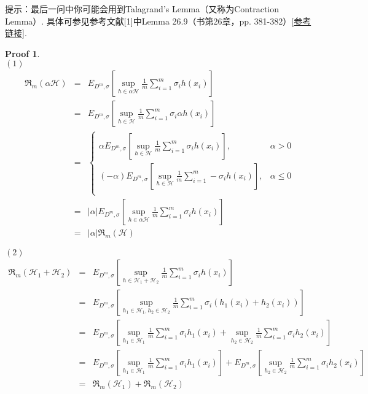 \documentclass[a4paper,UTF8]{article}
\numberwithin{equation}{section}
\newtheorem*{myProof}{Proof}
\begin{document}
\noindent 提示：最后一问中你可能会用到Talagrand's Lemma（又称为Contraction Lemma）. 具体可参见参考文献[1]中Lemma 26.9（书第26章，pp. 381-382）[\href{http://www.cs.huji.ac.il/~shais/UnderstandingMachineLearning/copy.html}{参考链接}].
\begin{myProof}~\\

$(1)$
\begin{eqnarray*}
\mathfrak{R}_m(\alpha \mathcal{H}) &=& E_{D^m, \sigma}[\sup_{h \in \alpha \mathcal{H}} \frac{1}{m} \sum_{i=1}^m \sigma_i h(x_i)] \\
&=& E_{D^m, \sigma}[\sup_{h \in \mathcal{H}} \frac{1}{m} \sum_{i=1}^m \sigma_i \alpha h(x_i)] \\
&=& \left\{
\begin{array}{lr}
	\alpha E_{D^m, \sigma}[\sup_{h \in \mathcal{H}} \frac{1}{m} \sum_{i=1}^m \sigma_i h(x_i)], &\alpha > 0 \\
	(-\alpha) E_{D^m, \sigma}[\sup_{h \in \mathcal{H}} \frac{1}{m} \sum_{i=1}^m -\sigma_i h(x_i)], &\alpha \le 0 \\
\end{array}
\right. \\
&=& |\alpha| E_{D^m, \sigma}[\sup_{h \in \alpha \mathcal{H}} \frac{1}{m} \sum_{i=1}^m \sigma_i h(x_i)] \\
&=& |\alpha| \mathfrak{R}_m(\mathcal{H})
\end{eqnarray*}

$(2)$
\begin{eqnarray*}
\mathfrak{R}_m(\mathcal{H}_1 + \mathcal{H}_2) &=& E_{D^m, \sigma}[\sup_{h \in \mathcal{H}_1 + \mathcal{H}_2} \frac{1}{m} \sum_{i=1}^m \sigma_i h(x_i)] \\
&=& E_{D^m, \sigma}[\sup_{h_1 \in \mathcal{H}_1, h_2 \in \mathcal{H}_2} \frac{1}{m} \sum_{i=1}^m \sigma_i \left( h_1(x_i) + h_2(x_i) \right)] \\
&=& E_{D^m, \sigma}[\sup_{h_1 \in \mathcal{H}_1} \frac{1}{m} \sum_{i=1}^m \sigma_i  h_1(x_i) + \sup_{h_2 \in \mathcal{H}_2} \frac{1}{m} \sum_{i=1}^m \sigma_i  h_2(x_i) ] \\
&=& E_{D^m, \sigma}[\sup_{h_1 \in \mathcal{H}_1} \frac{1}{m} \sum_{i=1}^m \sigma_i  h_1(x_i)] + E_{D^m, \sigma}[\sup_{h_2 \in \mathcal{H}_2} \frac{1}{m} \sum_{i=1}^m \sigma_i  h_2(x_i) ] \\
&=& \mathfrak{R}_m(\mathcal{H}_1) + \mathfrak{R}_m(\mathcal{H}_2)\\
\end{eqnarray*}


\end{myProof}
\end{document}
